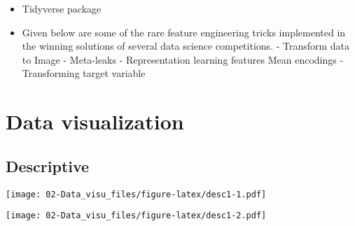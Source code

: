\documentclass[]{book}
\newenvironment{Shaded}{\begin{snugshade}}{\end{snugshade}}
\newcommand{\KeywordTok}[1]{\textcolor[rgb]{0.13,0.29,0.53}{\textbf{#1}}}
\newcommand{\DataTypeTok}[1]{\textcolor[rgb]{0.13,0.29,0.53}{#1}}
\newcommand{\DecValTok}[1]{\textcolor[rgb]{0.00,0.00,0.81}{#1}}
\newcommand{\StringTok}[1]{\textcolor[rgb]{0.31,0.60,0.02}{#1}}
\newcommand{\CommentTok}[1]{\textcolor[rgb]{0.56,0.35,0.01}{\textit{#1}}}
\newcommand{\OperatorTok}[1]{\textcolor[rgb]{0.81,0.36,0.00}{\textbf{#1}}}
\newcommand{\NormalTok}[1]{#1}
\providecommand{\tightlist}{%
  \setlength{\itemsep}{0pt}\setlength{\parskip}{0pt}}
\theoremstyle{definition}
\theoremstyle{definition}
\theoremstyle{definition}
\theoremstyle{remark}
\begin{document}
\begin{itemize}
\tightlist
\item
  Tidyverse package
\item
  Given below are some of the rare feature engineering tricks
  implemented in the winning solutions of several data science
  competitions. - Transform data to Image - Meta-leaks - Representation
  learning features Mean encodings - Transforming target variable
\end{itemize}

\chapter{Data visualization}\label{data-visualization}

\section{Descriptive}\label{descriptive}

\begin{Shaded}
\end{Shaded}

\texttt{[image: 02-Data\_visu\_files/figure-latex/desc1-1.pdf]}

\begin{Shaded}
\end{Shaded}

\texttt{[image: 02-Data\_visu\_files/figure-latex/desc1-2.pdf]}

\begin{Shaded}
\end{Shaded}
\end{document}
